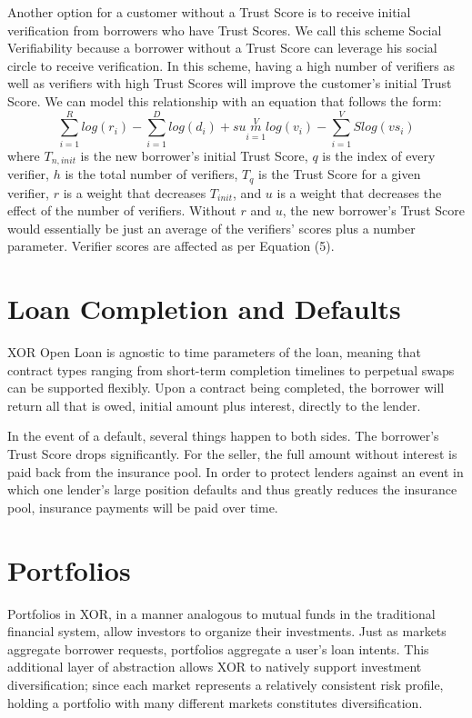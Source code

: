 \documentclass[twoside]{article}
\begin{document}
Another option for a customer without a Trust Score is to receive initial verification from borrowers who have Trust Scores. We call this scheme Social Verifiability because a borrower without a Trust Score can leverage his social circle to receive verification. In this scheme, having a high number of verifiers as well as verifiers with high Trust Scores will improve the customer's initial Trust Score. We can model this relationship with an equation that follows the form: 
\begin{equation}
   \sum\limits_{i=1}^R log(r_{i}) - \sum\limits_{i=1}^D log(d_{i})  + sum\limits_{i=1}^V log(v_{i}) - \sum\limits_{i=1}^VS log(vs_{i})
\end{equation}
where $T_{n,init}$ is the new borrower's initial Trust Score, $q$ is the index of every verifier, $h$ is the total number of verifiers, $T_{q}$ is the Trust Score for a given verifier, $r$ is a weight that decreases $T_{init}$, and $u$ is a weight that decreases the effect of the number of verifiers. Without $r$ and $u$, the new borrower's Trust Score would essentially be just an average of the verifiers' scores plus a number parameter. Verifier scores are affected as per Equation (5). 

\section{Loan Completion and Defaults}
XOR Open Loan is agnostic to time parameters of the loan, meaning that contract types ranging from short-term completion timelines to perpetual swaps can be supported flexibly. Upon a contract being completed, the borrower will return all that is owed, initial amount plus interest, directly to the lender. 

In the event of a default, several things happen to both sides. The borrower's Trust Score drops significantly. For the seller, the full amount without interest is paid back from the insurance pool. In order to protect lenders against an event in which one lender's large position defaults and thus greatly reduces the insurance pool, insurance payments will be paid over time. 

\section{Portfolios}
Portfolios in XOR, in a manner analogous to mutual funds in the traditional financial system, allow investors to organize their investments. Just as markets aggregate borrower requests, portfolios aggregate a user’s loan intents. This additional layer of abstraction allows XOR to natively support investment diversification; since each market represents a relatively consistent risk profile, holding a portfolio with many different markets constitutes diversification.
\end{document}
